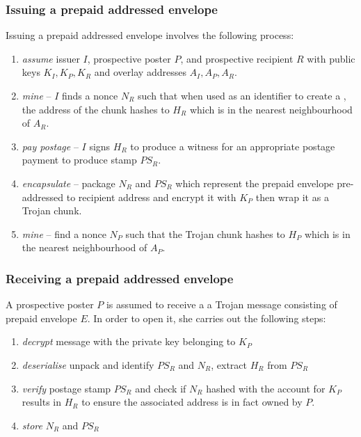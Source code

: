 \subsubsection{Issuing a prepaid addressed envelope}

Issuing a prepaid addressed envelope involves the following process:

\begin{enumerate}
\item \emph{assume} issuer $I$, prospective poster $P$, and prospective recipient $R$ with public keys $K_I, K_P, K_R$ and overlay addresses $A_I, A_P, A_R$.
\item \emph{mine} -- $I$ finds a nonce $N_R$ such that when used as an identifier to create a , the  address of the chunk hashes to $H_R$ which is in the nearest neighbourhood of $A_R$.
\item \emph{pay postage} -- $I$ signs $H_R$ to produce a witness for an appropriate postage payment to produce stamp $PS_R$.
\item \emph{encapsulate} -- package $N_R$ and $PS_R$ which represent the prepaid envelope pre-addressed to recipient address and encrypt it with $K_P$ then wrap it as a Trojan chunk.
\item \emph{mine} -- find a nonce $N_P$ such that the Trojan chunk hashes to $H_P$ which is in the nearest neighbourhood of $A_P$. 
\end{enumerate}




\subsubsection{Receiving a prepaid addressed envelope}

A prospective poster $P$ is assumed to receive a a Trojan message consisting of prepaid envelope $E$. In order to open it, she carries out the following steps:

\begin{enumerate}
    \item \emph{decrypt} message with the private key belonging to $K_P$
    \item \emph{deserialise} unpack and identify $PS_R$ and $N_R$, extract $H_R$ from $PS_R$
    \item \emph{verify} postage stamp $PS_R$ and check if $N_R$ hashed with the account for $K_P$ results in $H_R$ to ensure the associated address is in fact owned by $P$.
    \item \emph{store} $N_R$ and $PS_R$ 
\end{enumerate}

